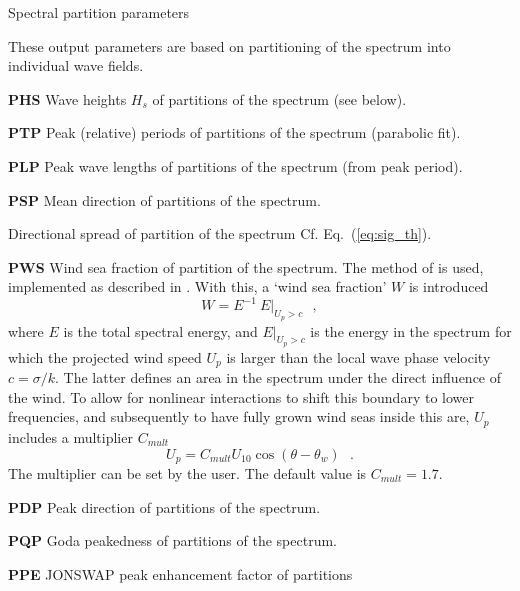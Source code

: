 \begin{list}{)\hfill}
\item{Spectral partition parameters} \label{out:spec_part}

These output parameters are based on
partitioning of the spectrum into individual wave fields.

\begin{list}{)\hfill}
            { \leftmargin 8mm 
             \rightmargin 5mm \itemsep 0mm \parsep 0mm}


\item \textbf{PHS}  Wave heights $H_s$ of partitions of the spectrum (see
      below). \label{out:first_part}
\item \textbf{PTP} Peak (relative) periods of partitions of the spectrum (parabolic fit).
\item \textbf{PLP} Peak wave lengths of partitions of the spectrum (from peak period).
\item \textbf{PSP} Mean direction of partitions of the spectrum.
\item Directional spread of partition of the spectrum
      Cf. Eq.~(\ref{eq:sig_th}).
\item \textbf{PWS} Wind sea fraction of partition of the spectrum.  The method of
\cite{art:HP01} is used, implemented as described in \cite{tol:Oahu07a}. With
this, a `wind sea fraction' $W$ is introduced
\begin{equation}
W = E^{-1}  \: E |_{U_p > c}  \:\:\: , \label{eq:wsf}
\end{equation}
where $E$ is the total spectral energy, and $E |_{U_p > c}$ is the energy in
the spectrum for which the projected wind speed $U_p$ is larger than the local
wave phase velocity $c = \sigma / k$. The latter defines an area in the
spectrum under the direct influence of the wind. To allow for nonlinear
interactions to shift this boundary to lower frequencies, and subsequently to
have fully grown wind seas inside this are, $U_p$ includes a multiplier
$C_{mult}$
\begin{equation}
U_p = C_{mult} U_{10} \cos ( \theta - \theta_w )  \:\:\: . \label{eq:Up}
\end{equation}
The multiplier can be set by the user. The default value is $C_{mult} = 1.7$.
\item \textbf{PDP} Peak direction of partitions of the spectrum.
\item \textbf{PQP} Goda peakedness of partitions of the spectrum.
\item \textbf{PPE} JONSWAP peak enhancement factor of partitions

\end{list}
\end{list}
